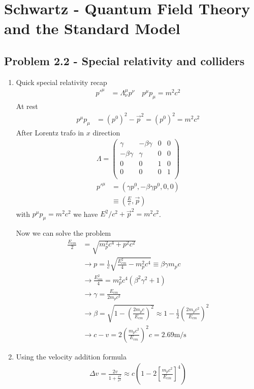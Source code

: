 \documentclass[../main.tex]{subfiles}
\begin{document}
\section{{\sc Schwartz} - Quantum Field Theory and the Standard Model}
\subsection{Problem 2.2 - Special relativity and colliders}
\begin{enumerate}
    \item Quick special relativity recap
    \begin{align}
        p'^\mu&=\Lambda^\mu_\nu p^\nu\quad p^\mu p_\mu=m^2c^2
    \end{align}
    At rest
    \begin{align}
        p^\mu p_\mu&=(p^0)^2-\vec{p}^2=(p^0)^2=m^2c^2
    \end{align}
    After Lorentz trafo in $x$ direction
    \begin{align}
        \Lambda=\begin{pmatrix}
        \gamma & -\beta\gamma & 0 & 0\\
        -\beta\gamma & \gamma & 0 & 0\\
        0 & 0 & 1 & 0\\
        0 & 0 & 0 & 1\\
        \end{pmatrix}
    \end{align}
    \begin{align}
        p'^\mu&=(\gamma p^0,-\beta\gamma p^0,0,0)\\
        &\equiv\left(\frac{E}{c},\vec{p}\right)
    \end{align}
    with $p^\mu p_\mu=m^2c^2$ we have $E^2/c^2+\vec{p}^2=m^2c^2$.
    
    Now we can solve the problem
    \begin{align}
        \frac{E_{cm}}{2}&=\sqrt{m_p^2c^4+p^2c^2}\\
        &\rightarrow p = \frac{1}{c}\sqrt{\frac{E_{cm}^2}{4}-m_p^2c^4}\equiv\beta\gamma m_pc\\
        &\rightarrow \frac{E_{cm}^2}{4}=m_p^2c^4(\beta^2\gamma^2+1)\\
        &\rightarrow \gamma=\frac{E_{cm}}{2m_pc^2}\\
        &\rightarrow\beta=\sqrt{1-\left(\frac{2m_pc}{E_{cm}}\right)^2}\approx1-\frac{1}{2}\left(\frac{2m_pc^2}{E_{cm}}\right)^2\\
        &\rightarrow c-v=2\left(\frac{m_pc^2}{E_{cm}}\right)^2c=2.69\text{m/s}
    \end{align}
    \item Using the velocity addition formula
    \begin{align}
        \Delta v=\frac{2v}{1+\frac{v^2}{c^2}}\approx c\left(1-2\left[\frac{m_pc^2}{E_{cm}}\right]^4\right)
    \end{align}
    
   

\end{enumerate}
\end{document}
